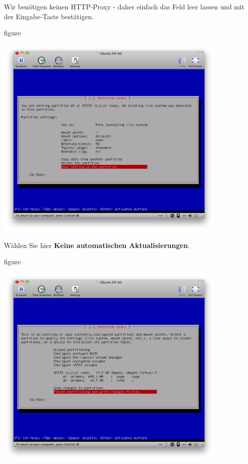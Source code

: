 \pagebreak
Wir benötigen keinen HTTP-Proxy - daher einfach das Feld leer lassen
und mit der Eingabe-Taste bestätigen.

\begin{nofloat}{figure}
\begin{center}
\includegraphics[width=0.85\textwidth]{screenshots/25_ubuntu_install.png}
\end{center}
\end{nofloat}

Wählen Sie hier \textbf{Keine automatischen Aktualisierungen}.

\begin{nofloat}{figure}
\begin{center}
\includegraphics[width=0.85\textwidth]{screenshots/26_ubuntu_install.png}
\end{center}
\end{nofloat}

